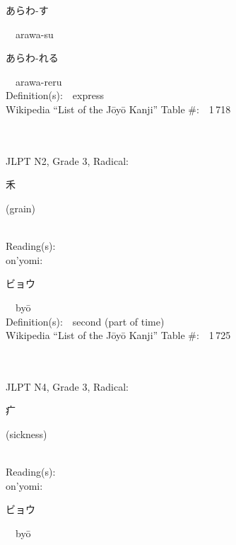 \begin{multicols}{2}
{\hspace*{2em}}{\begin{CJK}{UTF8}{min} あらわ-す \end{CJK}}\ \ arawa-su\ \ \\
{\hspace*{2em}}{\begin{CJK}{UTF8}{min} あらわ-れる \end{CJK}}\ \ arawa-reru\ \ \\
Definition(s):\ \ express \\
Wikipedia ``List of the J\=oy\=o Kanji'' Table \#:\ \ 1\,718 \\
\ \ \\
{\fontsize{34pt}{40pt}  }\ \ \\  %
{JLPT N2, Grade 3, Radical:\ \ {\begin{CJK}{UTF8}{min} 禾 \end{CJK}} (grain) } \\
Reading(s):\ \ \\
{\hspace*{1em}}on'yomi:\ \ \\
{\hspace*{2em}}{\begin{CJK}{UTF8}{min} ビョウ \end{CJK}}\ \ by\=o\ \ \\
Definition(s):\ \ second (part of time) \\
Wikipedia ``List of the J\=oy\=o Kanji'' Table \#:\ \ 1\,725 \\
\ \ \\
{\fontsize{34pt}{40pt}  }\ \ \\  %
{JLPT N4, Grade 3, Radical:\ \ {\begin{CJK}{UTF8}{min} 疒 \end{CJK}} (sickness) } \\
Reading(s):\ \ \\
{\hspace*{1em}}on'yomi:\ \ \\
{\hspace*{2em}}{\begin{CJK}{UTF8}{min} ビョウ \end{CJK}}\ \ by\=o\ \ \\

\end{multicols}
